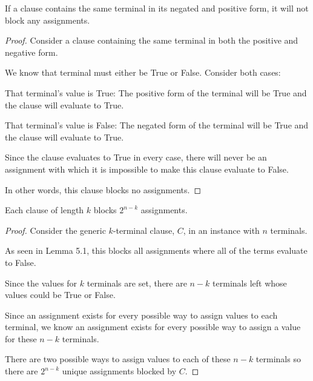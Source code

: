 \documentclass[manuscript]{acmart}
\begin{document}
    \begin{lemma}
        If a clause contains the same terminal in its negated and positive form, it will not block any assignments.
    \end{lemma}
    \begin{proof}

        Consider a clause containing the same terminal in both the positive and negative form.

        We know that terminal must either be True or False. Consider both cases:

        That terminal's value is True: The positive form of the terminal will be True and the clause will evaluate to True.

        That terminal's value is False: The negated form of the terminal will be True and the clause will evaluate to True.

        Since the clause evaluates to True in every case, there will never be an assignment with which it is impossible to make this clause evaluate to False.

        In other words, this clause blocks no assignments.
    \end{proof}

    \begin{lemma}
        Each clause of length $k$ blocks $2^{n-k}$ assignments.
    \end{lemma}
    \begin{proof}
        Consider the generic $k$-terminal clause, $C$, in an instance with $n$ terminals.

        As seen in Lemma 5.1, this blocks all assignments where all of the terms evaluate to False.

        Since the values for $k$ terminals are set, there are $n-k$ terminals left whose values could be True or False.

        Since an assignment exists for every possible way to assign values to each terminal, we know an assignment exists for every possible way to assign a value for these $n-k$ terminals.

        There are two possible ways to assign values to each of these $n-k$ terminals so there are $2^{n-k}$ unique assignments blocked by $C$.
    \end{proof}
\end{document}
